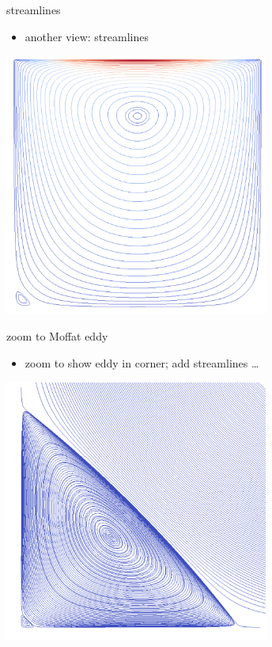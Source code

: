 \documentclass[hide notes,intlimits,usenames,dvipsnames]{beamer}
\begin{document}
\begin{frame}{streamlines}

\begin{itemize}
\item another view: streamlines
\end{itemize}

\begin{center}
\includegraphics[width=0.65\textwidth]{lidbox-streamlines}
\end{center}
\end{frame}


\begin{frame}{zoom to Moffat eddy}

\begin{itemize}
\item zoom to show eddy in corner; add streamlines \dots
\end{itemize}

\begin{center}
\includegraphics[width=0.65\textwidth]{lidbox-streamlines-zoom1}
\end{center}
\end{frame}
\end{document}
